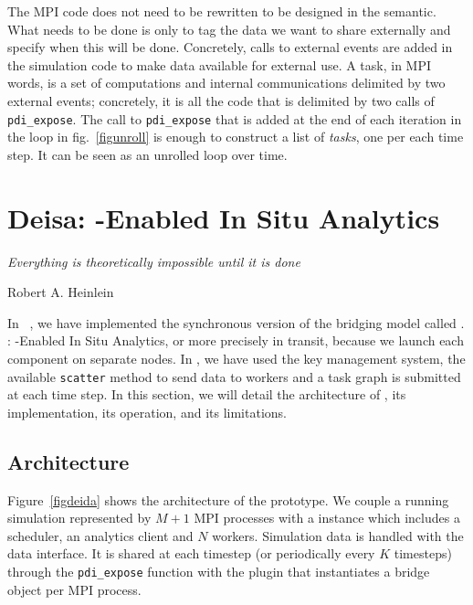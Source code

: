 The MPI code does not need to be rewritten to be designed in the \deisa semantic. What needs to be done is only to tag the data we want to share externally and specify when this will be done. Concretely, calls to external events are added in the simulation code to make data available for external use. A \deisa task, in MPI words, is a set of computations and internal communications delimited by two external events; concretely, it is all the code that is delimited by two calls of \texttt{pdi\_expose}. The call to \texttt{pdi\_expose} that is added at the end of each iteration in the loop in fig.~\ref{figunroll} is enough to construct a list of \textit{\deisa tasks}, one per each time step. It can be seen as an unrolled loop over time.




\chapter{Deisa: \dask-Enabled In Situ Analytics} \label{deisachapter}
\vspace{20mm}

\epigraph{\textit{Everything is theoretically impossible until it is done}} {Robert A. Heinlein}
\vfill


In \deisa~\cite{deisa}, we have implemented the synchronous version of the bridging model called \deisa. \deisa: \dask-Enabled In Situ Analytics, or more precisely in transit, because we launch each component on separate nodes. In \deisa, we have used the \dask key management system, the available \texttt{scatter} method to send data to \dask workers and a task graph is submitted at each time step. 
In this section, we will detail the architecture of \deisa, its implementation, its operation, and its limitations.  

\newpage

\section{Architecture}
Figure~\ref{figdeida} shows the architecture of the \deisa prototype. We couple a running simulation represented by $M+1$ MPI processes with a \dask instance which includes a scheduler, an analytics client and $N$ workers.
Simulation data is handled with the \pdi data interface. It is shared at each timestep (or periodically every $K$ timesteps) through the \texttt{pdi\_expose} function with the \deisa plugin that instantiates a bridge object per MPI process. 

